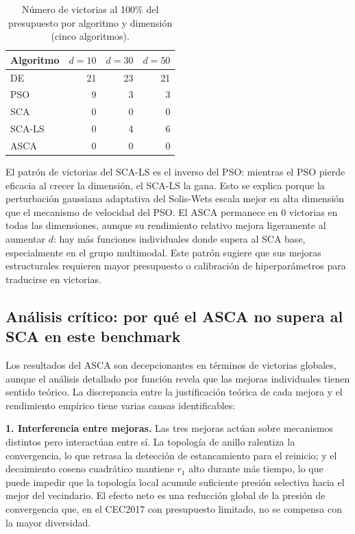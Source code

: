 \documentclass[12pt,a4paper]{article}
\begin{document}
\begin{table}[H]
\centering
\caption{Número de victorias al 100\% del presupuesto por algoritmo y dimensión (cinco algoritmos).}
\label{tab:comparativa_dims_sca_ls}
\renewcommand{\arraystretch}{1.2}
\begin{tabular}{lrrr}
\toprule
\textbf{Algoritmo} & $d=10$ & $d=30$ & $d=50$ \\
\midrule
DE      & 21 & 23 & 21 \\
PSO     &  9 &  3 &  3 \\
SCA     &  0 &  0 &  0 \\
SCA-LS  &  0 &  4 &  6 \\
ASCA    &  0 &  0 &  0 \\
\bottomrule
\end{tabular}
\end{table}
 
El patrón de victorias del SCA-LS es el inverso del PSO: mientras el PSO pierde eficacia al crecer la dimensión, el SCA-LS la gana. Esto se explica porque la perturbación gaussiana adaptativa del Solis-Wets escala mejor en alta dimensión que el mecanismo de velocidad del PSO. El ASCA permanece en 0 victorias en todas las dimensiones, aunque su rendimiento relativo mejora ligeramente al aumentar $d$: hay más funciones individuales donde supera al SCA base, especialmente en el grupo multimodal. Este patrón sugiere que sus mejoras estructurales requieren mayor presupuesto o calibración de hiperparámetros para traducirse en victorias.

 
\subsection{Análisis crítico: por qué el ASCA no supera al SCA en este benchmark}
 
Los resultados del ASCA son decepcionantes en términos de victorias globales, aunque el análisis detallado por función revela que las mejoras individuales tienen sentido teórico. La discrepancia entre la justificación teórica de cada mejora y el rendimiento empírico tiene varias causas identificables:
 
\textbf{1. Interferencia entre mejoras.} Las tres mejoras actúan sobre mecanismos distintos pero interactúan entre sí. La topología de anillo ralentiza la convergencia, lo que retrasa la detección de estancamiento para el reinicio; y el decaimiento coseno cuadrático mantiene $r_1$ alto durante más tiempo, lo que puede impedir que la topología local acumule suficiente presión selectiva hacia el mejor del vecindario. El efecto neto es una reducción global de la presión de convergencia que, en el CEC2017 con presupuesto limitado, no se compensa con la mayor diversidad.
 
\end{document}
